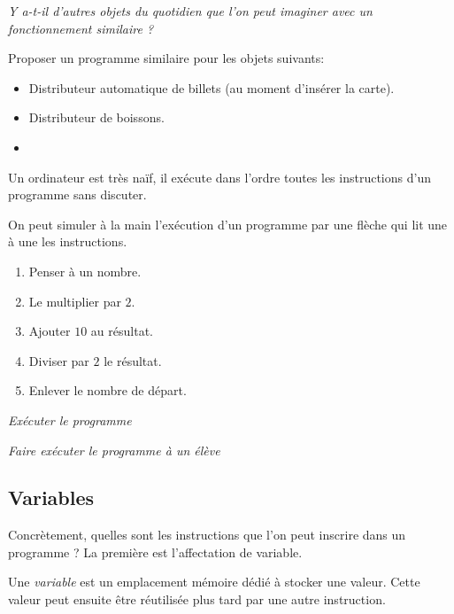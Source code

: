 \documentclass{article}
\begin{document}
\emph{Y a-t-il d'autres objets du quotidien que l'on peut imaginer avec un fonctionnement similaire ?}

\begin{exercize}
Proposer un programme similaire pour les objets suivants:
\begin{itemize}
\item Distributeur automatique de billets (au moment d'insérer la carte).
\item Distributeur de boissons.
\item 
\end{itemize}
\end{exercize}

Un ordinateur est très naïf, il exécute dans l'ordre toutes les instructions d'un programme sans discuter.

\begin{example}
On peut simuler à la main l'exécution d'un programme par une flèche qui lit une à une les instructions.
\begin{enumerate}
\item Penser à un nombre.
\item Le multiplier par $2$.
\item Ajouter $10$ au résultat.
\item Diviser par $2$ le résultat.
\item Enlever le nombre de départ.
\end{enumerate}
\end{example}

\emph{Exécuter le programme}

\emph{Faire exécuter le programme à un élève}

\subsection{Variables}

Concrètement, quelles sont les instructions que l'on peut inscrire dans un programme ? La première est l'affectation de variable.

\begin{definition}
Une \emph{variable} est un emplacement mémoire dédié à stocker une valeur. Cette valeur peut ensuite être réutilisée plus tard par une autre instruction.
\end{definition}
\end{document}
